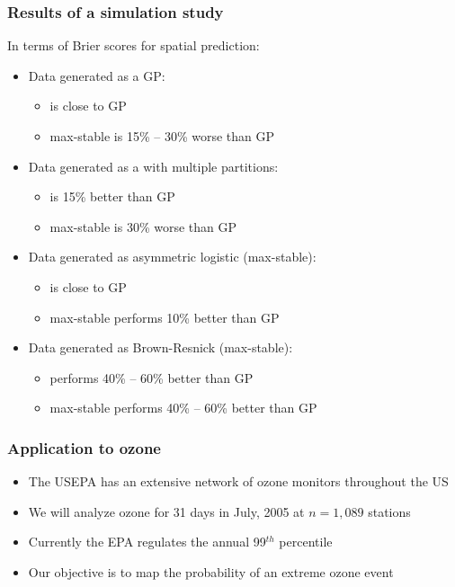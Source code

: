 \documentclass{beamer}
\begin{document}
\begin{frame}\frametitle{Results of a simulation study}
In terms of Brier scores for spatial prediction:\vspace{1em}
\begin{itemize}\setlength\itemsep{1em}
	\item Data generated as a GP:
	\begin{itemize}
	 	\item \skewt{} is close to GP
	 	\item max-stable is 15\% -- 30\% worse than GP
	\end{itemize}
	\item Data generated as a \skewt{} with multiple partitions:
	\begin{itemize}
		\item \skewt{} is 15\% better than GP
	 	\item max-stable is 30\% worse than GP
	\end{itemize}
	\item Data generated as asymmetric logistic (max-stable):
	\begin{itemize}
		\item \skewt{} is close to GP
		\item max-stable performs 10\% better than GP
	\end{itemize}
 	\item Data generated as Brown-Resnick (max-stable):
 	\begin{itemize}
		\item \skewt{} performs 40\% -- 60\% better than GP
 		\item max-stable performs 40\% -- 60\% better than GP
 	\end{itemize}
\end{itemize}
\end{frame}


 \begin{frame}\frametitle{Application to ozone}
 	\begin{itemize}\setlength\itemsep{\fill}
 	\item The USEPA has an extensive network of ozone monitors throughout the US
 	\item We will analyze ozone for 31 days in July, 2005 at $n=1,089$ stations
 	\item Currently the EPA regulates the annual 99$^{th}$ percentile
 	\item Our objective is to map the probability of an extreme ozone event
 	\end{itemize}
 \end{frame}
\end{document}
